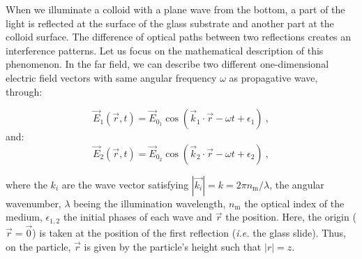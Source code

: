 When we illuminate a colloid with a plane wave from the bottom, a part of the light is reflected at the surface of the glass substrate and another part at the colloid surface. The difference of optical paths between two reflections creates an interference patterns. Let us focus on the mathematical description of this phenomenon. In the far field, we can describe two different one-dimensional electric field vectors with same angular frequency $\omega$ \cite{f_bohren_absorption_1998} as propagative wave, through:

\begin{equation}
	\vec{E}_1(\vec{r}, t) = \vec{E}_{0_1} \cos(\vec{k}_1 \cdot \vec{r} - \omega t + \epsilon_1) ~,
\end{equation}
and:
\begin{equation}
	\vec{E}_2(\vec{r}, t) = \vec{E}_{0_2} \cos (\vec{k}_2 \cdot \vec{r} - \omega t + \epsilon_2) ~,
\end{equation}



where the $k_i$ are the wave vector satisfying $|\vec{k_i}|=k =2\pi n_{\mathrm{m}}/\lambda$, the angular wavenumber, $\lambda$ beeing the illumination wavelength, $n_\mathrm{m}$ the optical index of the medium, $\epsilon_{1,2}$ the initial phases of each wave and $\vec{r}$ the position. Here, the origin ($\vec{r} = \vec{0}$) is taken at the position of the first reflection (\textit{i.e.} the glass slide). Thus, on the particle, $\vec{r}$ is given by the particle's height such that $|r| = z$. 

